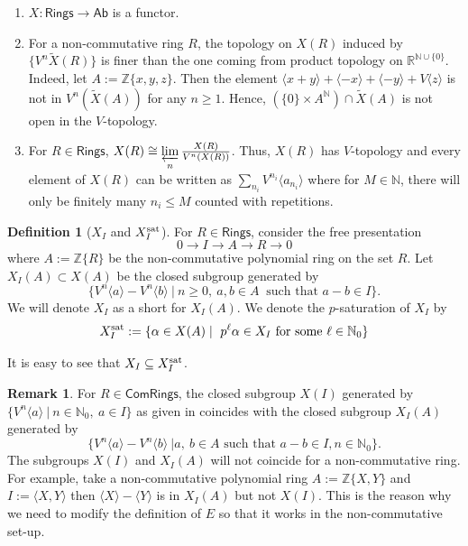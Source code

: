 \documentclass[11pt]{amsart}
\theoremstyle{plain}
\theoremstyle{definition}
\newtheorem{remark}[thm]{Remark}
\newtheorem{definition}[thm]{Definition}
\newcommand{\ilim}{\mathop{\varprojlim}\limits} %
\renewcommand{\tilde}{\widetilde}
\newcommand{\sat}{{\rm sat}}
\newcommand{\N}{{\mathbb N}}
\newcommand{\R}{{\mathbb R}}
\newcommand{\Z}{{\mathbb Z}}
\newcommand{\ab}[1]{\langle {#1} \rangle}
\newcommand{\ac}[1]{\{#1\}}
\newcommand{\Rings}{{\mathsf{Rings}}}
\newcommand{\Com}{{\mathsf{ComRings}}}
\newcommand{\Ab}{{\mathsf{Ab}}}
\begin{document}
\label{prop:ncxa}
\begin{enumerate}
\item $X: \Rings \to \Ab$ is a functor. 
\item For a non-commutative ring $R$, the topology on $X(R)$ induced by $\{V^n \tilde{X}(R)\}$ is finer than the one coming from product topology on $\R^{\N \cup \{0\}}$. Indeed, let $A:=\Z\ac{x, y, z}$. Then the element $\ab{x+y}+ \ab{-x}+ \ab{-y}+V\ab{z}$ is not in $V^n(\tilde{X}(A))$ for any $n \geq 1$. Hence, $(\{0\} \times A^{\N}) \cap \tilde{X}(A)$ is not open in the $V$-topology.
\item For $R \in \Rings$, $X(R) \cong \ilim_n \frac{X(R)}{V^n(X(R))}$. Thus, $X(R)$ has $V$-topology and 
every element of $X(R)$ can be written as $\sum_{n_i}V^{n_i}\ab{a_{n_i}}$ where for $M \in \N$, there will only be finitely many $n_i \leq M$ counted with repetitions.
\end{enumerate}

\begin{definition}[$X_I$ and $X_I^{\sat}$]\label{def:XI}
For $R \in \Rings$, consider the free presentation $$0 \to I \to A \to R \to 0 $$ where $A:=\Z \{ R\}$ be the non-commutative polynomial ring on the set $R$.  Let $X_I(A) \subset X(A)$ be the closed subgroup generated by $$\{V^n\ab{a}-V^n\ab{b} \ | \ n\geq 0,  \ a,b\in A \ \text{ such that } a-b\in I\}.$$ We will denote $X_I$ as a short for $X_I(A)$. We denote the $p$-saturation of $X_I$ by 
$$X_I^{\sat} := \{ \alpha \in X(A) \mid \ p^{\ell}\alpha \in X_I  \text{ for some } \ell \in \N_0 \} $$  
\end{definition}
\noindent It is easy to see that $X_I \subseteq X_I^{\sat}$.
\begin{remark}
For $R \in \Com$, the closed subgroup $X(I)$ generated by $\{V^n\ab{a} \ | \ n \in \N_0,  \ a\in  I\}$ as given in \cite[Prop.1.2]{cd} coincides with the closed subgroup $X_I(A)$ generated by 
$$\{V^n\ab{a}-V^n\ab{b} \ |a,\ b \in A \text{ such that } a-b \in I,  n \in \N_0 \}.$$  The subgroups $X(I)$ and $X_I(A)$ will not coincide for a non-commutative ring. For example, take a non-commutative polynomial ring $A:= \Z\{X, Y\}$ and $I:=\ab{X, Y} $ then $\ab{X} - \ab{Y}$ is in $X_I(A)$ but not $X(I)$. This is the reason why we need to modify the definition of $E$ so that it works in the non-commutative set-up. 
\end{remark}
\vspace{2mm}
\end{document}
